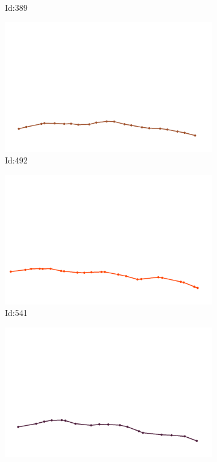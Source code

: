 \documentclass[12pt,twoside]{report}
\begin{document}
\begin{figure}
\begin{subfigure}[b]{0.20\textwidth}
\caption{Id:389}
\end{subfigure}
\begin{subfigure}[b]{0.20\textwidth}
\centering
\includegraphics[width=\textwidth]{../../trajectories/492.png}
\caption{Id:492}
\end{subfigure}
\begin{subfigure}[b]{0.20\textwidth}
\centering
\includegraphics[width=\textwidth]{../../trajectories/541.png}
\caption{Id:541}
\end{subfigure}
\begin{subfigure}[b]{0.20\textwidth}
\centering
\includegraphics[width=\textwidth]{../../trajectories/613.png}

\end{subfigure}
\end{figure}
\end{document}
